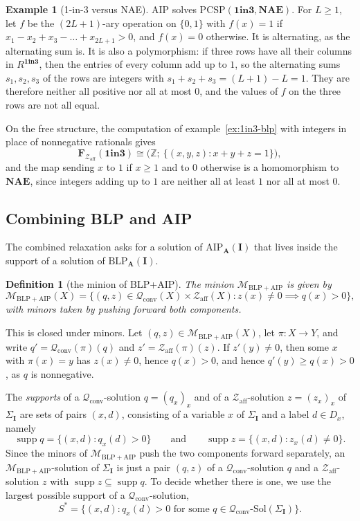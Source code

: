 \documentclass[11pt]{article}
\theoremstyle{plain}
\newtheorem{definition}[theorem]{Definition}
\theoremstyle{definition}
\newtheorem{example}[theorem]{Example}
\newcommand{\Solm}[1]{#1\text{-}\mathrm{Sol}}
\newcommand{\supp}{\operatorname{supp}}
\newcommand{\bA}{\mathbf{A}}
\newcommand{\bI}{\mathbf{I}}
\newcommand{\bF}{\mathbf{F}}
\newcommand{\Z}{\mathbb{Z}}
\newcommand{\Qc}{\mathscr{Q}_{\mathrm{conv}}}
\newcommand{\Za}{\mathscr{Z}_{\mathrm{aff}}}
\newcommand{\Mba}{\mathscr{M}_{\mathrm{BLP+AIP}}}
\newcommand{\OIT}{\mathbf{1in3}}
\newcommand{\NAE}{\mathbf{NAE}}
\newcommand{\PCSP}{\mathrm{PCSP}}
\newcommand{\BLP}{\mathrm{BLP}}
\newcommand{\AIP}{\mathrm{AIP}}
\begin{document}
\begin{example}[1-in-3 versus NAE]\label{ex:1in3-aip}
AIP solves $\PCSP(\OIT,\NAE)$. For $L\geq1$, let $f$ be the $(2L+1)$-ary operation on $\{0,1\}$ with $f(x)=1$ if $x_1-x_2+x_3-\dots+x_{2L+1}>0$, and $f(x)=0$ otherwise. It is alternating, as the alternating sum is. It is also a polymorphism: if three rows have all their columns in $R^{\OIT}$, then the entries of every column add up to $1$, so the alternating sums $s_1,s_2,s_3$ of the rows are integers with $s_1+s_2+s_3=(L+1)-L=1$. They are therefore neither all positive nor all at most $0$, and the values of $f$ on the three rows are not all equal.

On the free structure, the computation of example~\ref{ex:1in3-blp} with integers in place of nonnegative rationals gives
\[
\bF_{\Za}(\OIT)\cong\big(\Z;\ \{(x,y,z) : x+y+z=1\}\big),
\]
and the map sending $x$ to $1$ if $x\geq1$ and to $0$ otherwise is a homomorphism to $\NAE$, since integers adding up to $1$ are neither all at least $1$ nor all at most $0$.
\end{example}

\subsection{Combining BLP and AIP}\label{sec:ba}

The combined relaxation asks for a solution of $\AIP_{\bA}(\bI)$ that lives inside the support of a solution of $\BLP_{\bA}(\bI)$.

\begin{definition}[the minion of BLP+AIP]
The minion $\Mba$ is given by
\[
\Mba(X)=\{(q,z)\in\Qc(X)\times\Za(X) : z(x)\neq0\implies q(x)>0\},
\]
with minors taken by pushing forward both components.
\end{definition}

This is closed under minors. Let $(q,z)\in\Mba(X)$, let $\pi\colon X\to Y$, and write $q'=\Qc(\pi)(q)$ and $z'=\Za(\pi)(z)$. If $z'(y)\neq0$, then some $x$ with $\pi(x)=y$ has $z(x)\neq0$, hence $q(x)>0$, and hence $q'(y)\geq q(x)>0$, as $q$ is nonnegative.

The \emph{supports} of a $\Qc$-solution $q=(q_x)_x$ and of a $\Za$-solution $z=(z_x)_x$ of $\Sigma_{\bI}$ are sets of pairs $(x,d)$, consisting of a variable $x$ of $\Sigma_{\bI}$ and a label $d\in D_x$, namely
\[
\supp q=\{(x,d) : q_x(d)>0\}\qquad\text{and}\qquad\supp z=\{(x,d) : z_x(d)\neq0\}.
\]
Since the minors of $\Mba$ push the two components forward separately, an $\Mba$-solution of $\Sigma_{\bI}$ is just a pair $(q,z)$ of a $\Qc$-solution $q$ and a $\Za$-solution $z$ with $\supp z\subseteq\supp q$. To decide whether there is one, we use the largest possible support of a $\Qc$-solution,
\[
S^*=\{(x,d) : q_x(d)>0 \text{ for some } q\in\Solm{\Qc}(\Sigma_{\bI})\}.
\]
\end{document}
